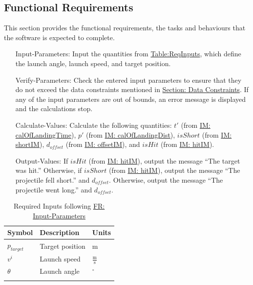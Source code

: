 \documentclass[12pt]{article}
\begin{document}
\subsection{Functional Requirements}
\label{Sec:FRs}
This section provides the functional requirements, the tasks and behaviours that the software is expected to complete.
\begin{itemize}
\item[Input-Parameters:\phantomsection\label{inputParams}]Input the quantities from \hyperref[Table:ReqInputs]{Table:ReqInputs}, which define the launch angle, launch speed, and target position.
\item[Verify-Parameters:\phantomsection\label{verifyParams}]Check the entered input parameters to ensure that they do not exceed the data constraints mentioned in \hyperref[Sec:DataConstraints]{Section: Data Constraints}. If any of the input parameters are out of bounds, an error message is displayed and the calculations stop.
\item[Calculate-Values:\phantomsection\label{calcValues}]Calculate the following quantities: $t'$ (from \hyperref[IM:calOfLandingTime]{IM: calOfLandingTime}), $p'$ (from \hyperref[IM:calOfLandingDist]{IM: calOfLandingDist}), $isShort$ (from \hyperref[IM:shortIM]{IM: shortIM}), ${d_{offset}}$ (from \hyperref[IM:offsetIM]{IM: offsetIM}), and $isHit$ (from \hyperref[IM:hitIM]{IM: hitIM}).
\item[Output-Values:\phantomsection\label{outputValues}]If $isHit$ (from \hyperref[IM:hitIM]{IM: hitIM}), output the message ``The target was hit.'' Otherwise, if $isShort$ (from \hyperref[IM:hitIM]{IM: hitIM}), output the message ``The projectile fell short.'' and ${d_{offset}}$. Otherwise, output the message ``The projectile went long.'' and ${d_{offset}}$.
\end{itemize}
\begin{longtable}{l l l}
\toprule
Symbol & Description & Units
\\
\midrule
\endhead
${p_{target}}$ & Target position & m
\\
${v^{i}}$ & Launch speed & $\frac{\text{m}}{\text{s}}$
\\
$θ$ & Launch angle & ${}^{\circ}$
\\
\bottomrule
\caption{Required Inputs following \hyperref[inputParams]{FR: Input-Parameters}}
\label{Table:ReqInputs}
\end{longtable}
\end{document}
